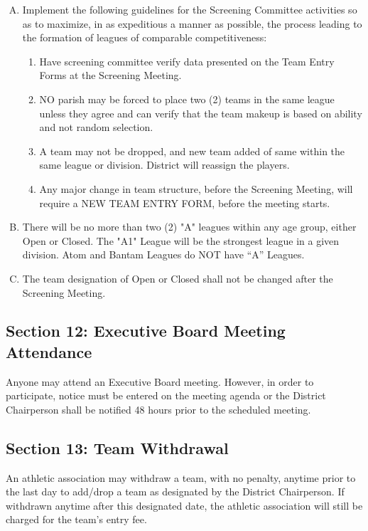 \documentclass[draft]{memoir}
\begin{document}
\begin{enumerate}[A.]
    \item Implement the following guidelines for the Screening Committee activities so as to maximize, in as expeditious a manner as possible, the process leading to the formation of leagues of comparable competitiveness:
    \begin{enumerate}[1.]
        \item Have screening committee verify data presented on the Team Entry Forms at the Screening Meeting.
        \item NO parish may be forced to place two (2) teams in the same league unless they agree and can verify that the team makeup is based on ability and not random selection.
        \item A team may not be dropped, and new team added of same within the same league or division. District will reassign the players.
        \item Any major change in team structure, before the Screening Meeting, will require a NEW TEAM ENTRY FORM, before the meeting starts.
    \end{enumerate}
    \item There will be no more than two (2) "A" leagues within any age group, either Open or Closed.  The "A1" League will be the strongest league in a given division.  Atom and Bantam Leagues do NOT have “A” Leagues.
    \item The team designation of Open or Closed shall not be changed after the Screening Meeting.
\end{enumerate}

\subsection{Section 12: Executive Board Meeting Attendance}
Anyone may attend an Executive Board meeting.  However, in order to participate, notice must be entered on the meeting agenda or the District Chairperson shall be notified 48 hours prior to the scheduled meeting.

\subsection{Section 13: Team Withdrawal}
An athletic association may withdraw a team, with no penalty, anytime prior to the last day to add/drop a team as designated by the District Chairperson.  If withdrawn anytime after this designated date, the athletic association will still be charged for the team's entry fee.


    
    
    

\backmatter
\end{document}
